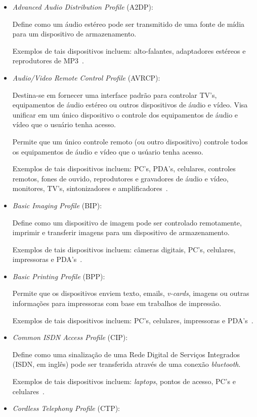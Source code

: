 \begin{itemize}
	\item \emph{Advanced Audio Distribution Profile} (A2DP): 

	Define como um áudio estéreo pode ser transmitido de uma fonte de mídia para um dispositivo de armazenamento.

	Exemplos de tais dispositivos incluem: alto-falantes, adaptadores estéreos e reprodutores de MP3~\cite{bluetoothprofilesA2DP}.
	\item \emph{Audio/Video Remote Control Profile} (AVRCP): 

	Destina-se em fornecer uma interface padrão para controlar TV's, equipamentos de áudio estéreo ou outros dispositivos de áudio e vídeo. Visa unificar em um único dispositivo o controle dos equipamentos de áudio e vídeo que o usuário tenha acesso.

	Permite que um único controle remoto (ou outro dispositivo) controle todos os equipamentos de áudio e vídeo que o usúario tenha acesso.

	Exemplos de tais dispositivos incluem: PC's, PDA's, celulares, controles remotos, fones de ouvido, reprodutores e gravadores de áudio e vídeo, monitores, TV's, sintonizadores e amplificadores~\cite{bluetoothprofilesAVRCP}.
	\item \emph{Basic Imaging Profile} (BIP): 

	Define como um dispositivo de imagem pode ser controlado remotamente, imprimir e transferir imagens para um dispositivo de armazenamento.

	Exemplos de tais dispositivos incluem: câmeras digitais, PC's, celulares, impressoras e PDA's~\cite{bluetoothprofilesBIP}.
	\item \emph{Basic Printing Profile} (BPP): 

	Permite que os dispositivos enviem texto, emails, \emph{v-cards}, imagens ou outras informações para impressoras com base em trabalhos de impressão.
	
	Exemplos de tais dispositivos incluem: PC's, celulares, impressoras e PDA's~\cite{bluetoothprofilesBPP}.
	\item \emph{Common ISDN Access Profile} (CIP): 

	Define como uma sinalização de uma Rede Digital de Serviços Integrados (ISDN, em inglês) pode ser transferida através de uma conexão \emph{bluetooth}.

	Exemplos de tais dispositivos incluem: \emph{laptops}, pontos de acesso, PC's e celulares~\cite{bluetoothprofilesCIP}.
	\item \emph{Cordless Telephony Profile} (CTP): 


\end{itemize}
